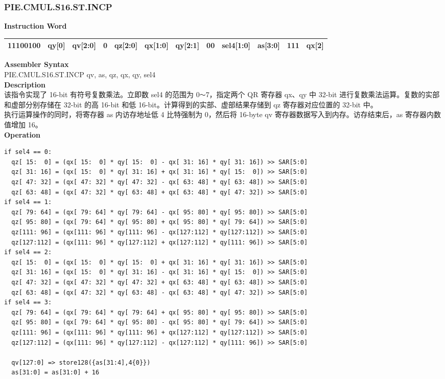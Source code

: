 \newpage
\subsubsection{PIE.CMUL.S16.ST.INCP}\label{instruction:PIECMULS16STINCP}
\setlength\tabcolsep{6pt}
\textbf{Instruction Word} \\
\begin{tabular}{|c|c|c|c|c|c|c|c|c|c|c|c|}
	\hline
	11100100 & qy[0] & qv[2:0] & 0 & qz[2:0] & qx[1:0] & qy[2:1] & 00 & sel4[1:0] & as[3:0] & 111 & qx[2] \\
	\hline
\end{tabular}

\textbf{Assembler Syntax} \\
PIE.CMUL.S16.ST.INCP qv, as, qz, qx, qy, sel4 \\
\textbf{Description} \\
该指令实现了 16-bit 有符号复数乘法。立即数 sel4 的范围为 0\verb+～+7，指定两个 QR 寄存器 qx、qy 中 32-bit 进行复数乘法运算。复数的实部和虚部分别存储在 32-bit 的高 16-bit 和低 16-bit。计算得到的实部、虚部结果存储到 qz 寄存器对应位置的 32-bit 中。\\ 执行运算操作的同时，将寄存器 as 内访存地址低 4 比特强制为 0，然后将 16-byte qv 寄存器数据写入到内存。访存结束后，as 寄存器内数值增加 16。\\
\textbf{Operation}
\begin{lstlisting}
if sel4 == 0:
  qz[ 15:  0] = (qx[ 15:  0] * qy[ 15:  0] - qx[ 31: 16] * qy[ 31: 16]) >> SAR[5:0]
  qz[ 31: 16] = (qx[ 15:  0] * qy[ 31: 16] + qx[ 31: 16] * qy[ 15:  0]) >> SAR[5:0]
  qz[ 47: 32] = (qx[ 47: 32] * qy[ 47: 32] - qx[ 63: 48] * qy[ 63: 48]) >> SAR[5:0]
  qz[ 63: 48] = (qx[ 47: 32] * qy[ 63: 48] + qx[ 63: 48] * qy[ 47: 32]) >> SAR[5:0]
if sel4 == 1:
  qz[ 79: 64] = (qx[ 79: 64] * qy[ 79: 64] - qx[ 95: 80] * qy[ 95: 80]) >> SAR[5:0]
  qz[ 95: 80] = (qx[ 79: 64] * qy[ 95: 80] + qx[ 95: 80] * qy[ 79: 64]) >> SAR[5:0]
  qz[111: 96] = (qx[111: 96] * qy[111: 96] - qx[127:112] * qy[127:112]) >> SAR[5:0]
  qz[127:112] = (qx[111: 96] * qy[127:112] + qx[127:112] * qy[111: 96]) >> SAR[5:0]
if sel4 == 2:
  qz[ 15:  0] = (qx[ 15:  0] * qy[ 15:  0] + qx[ 31: 16] * qy[ 31: 16]) >> SAR[5:0]
  qz[ 31: 16] = (qx[ 15:  0] * qy[ 31: 16] - qx[ 31: 16] * qy[ 15:  0]) >> SAR[5:0]
  qz[ 47: 32] = (qx[ 47: 32] * qy[ 47: 32] + qx[ 63: 48] * qy[ 63: 48]) >> SAR[5:0]
  qz[ 63: 48] = (qx[ 47: 32] * qy[ 63: 48] - qx[ 63: 48] * qy[ 47: 32]) >> SAR[5:0]
if sel4 == 3:
  qz[ 79: 64] = (qx[ 79: 64] * qy[ 79: 64] + qx[ 95: 80] * qy[ 95: 80]) >> SAR[5:0]
  qz[ 95: 80] = (qx[ 79: 64] * qy[ 95: 80] - qx[ 95: 80] * qy[ 79: 64]) >> SAR[5:0]
  qz[111: 96] = (qx[111: 96] * qy[111: 96] + qx[127:112] * qy[127:112]) >> SAR[5:0]
  qz[127:112] = (qx[111: 96] * qy[127:112] - qx[127:112] * qy[111: 96]) >> SAR[5:0]

  qv[127:0] => store128({as[31:4],4{0}})
  as[31:0] = as[31:0] + 16
\end{lstlisting}

